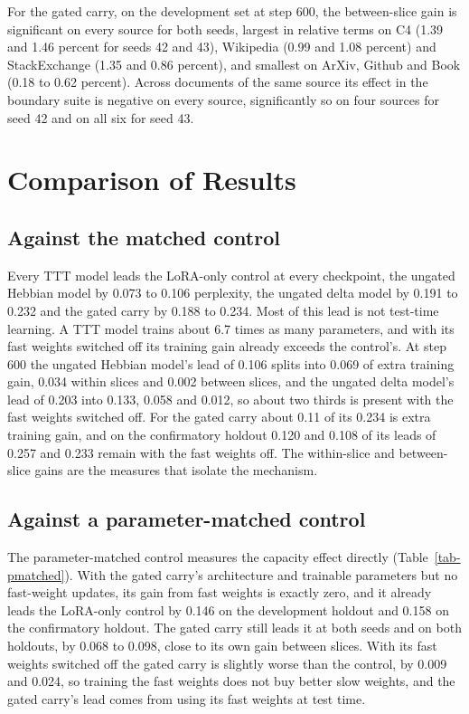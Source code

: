\documentclass[12pt,a4paper]{report}
\begin{document}
For the gated carry, on the development set at step 600, the between-slice gain is significant on every source for both seeds, largest in relative terms on C4 (1.39 and 1.46 percent for seeds 42 and 43), Wikipedia (0.99 and 1.08 percent) and StackExchange (1.35 and 0.86 percent), and smallest on ArXiv, Github and Book (0.18 to 0.62 percent). Across documents of the same source its effect in the boundary suite is negative on every source, significantly so on four sources for seed 42 and on all six for seed 43.

\section{Comparison of Results}
\label{sec-compare}

\subsection{Against the matched control}

Every TTT model leads the LoRA-only control at every checkpoint, the ungated Hebbian model by 0.073 to 0.106 perplexity, the ungated delta model by 0.191 to 0.232 and the gated carry by 0.188 to 0.234. Most of this lead is not test-time learning. A TTT model trains about 6.7 times as many parameters, and with its fast weights switched off its training gain already exceeds the control's. At step 600 the ungated Hebbian model's lead of 0.106 splits into 0.069 of extra training gain, 0.034 within slices and 0.002 between slices, and the ungated delta model's lead of 0.203 into 0.133, 0.058 and 0.012, so about two thirds is present with the fast weights switched off. For the gated carry about 0.11 of its 0.234 is extra training gain, and on the confirmatory holdout 0.120 and 0.108 of its leads of 0.257 and 0.233 remain with the fast weights off. The within-slice and between-slice gains are the measures that isolate the mechanism.

\subsection{Against a parameter-matched control}

The parameter-matched control measures the capacity effect directly (Table~\ref{tab-pmatched}). With the gated carry's architecture and trainable parameters but no fast-weight updates, its gain from fast weights is exactly zero, and it already leads the LoRA-only control by 0.146 on the development holdout and 0.158 on the confirmatory holdout. The gated carry still leads it at both seeds and on both holdouts, by 0.068 to 0.098, close to its own gain between slices. With its fast weights switched off the gated carry is slightly worse than the control, by 0.009 and 0.024, so training the fast weights does not buy better slow weights, and the gated carry's lead comes from using its fast weights at test time.
\end{document}
